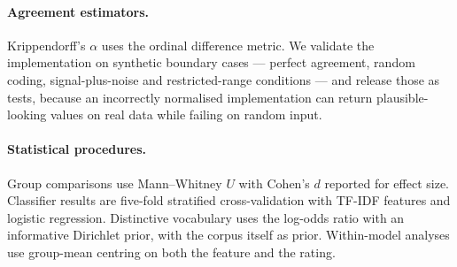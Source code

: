 \documentclass[11pt]{article}
\begin{document}
\paragraph{Agreement estimators.} Krippendorff's $\alpha$ uses the ordinal
difference metric. We validate the implementation on synthetic boundary cases
--- perfect agreement, random coding, signal-plus-noise and restricted-range
conditions --- and release those as tests, because an incorrectly normalised
implementation can return plausible-looking values on real data while failing
on random input.

\paragraph{Statistical procedures.} Group comparisons use Mann--Whitney $U$ with
Cohen's $d$ reported for effect size. Classifier results are five-fold
stratified cross-validation with TF-IDF features and logistic regression.
Distinctive vocabulary uses the log-odds ratio with an informative Dirichlet
prior, with the corpus itself as prior. Within-model analyses use group-mean
centring on both the feature and the rating.
\end{document}
